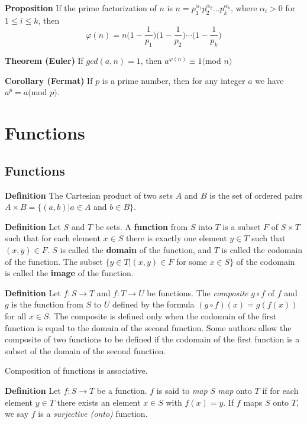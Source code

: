 \documentclass[12pt]{article}
\renewcommand{\mod}{$mod $}
\begin{document}
\textbf{Proposition} If the prime factorization of $n$ is $n = p_{1}^{\alpha_{1}}p_{2}^{\alpha_{2}} \ldots p_{k}^{\alpha_{k}}$, where $\alpha_{i} > 0$ for $1 \leq i \leq k $, then $$\varphi (n) = n \Big( 1 - \frac{1}{p_{1}} \Big) \Big( 1 - \frac{1}{p_{2}} \Big) \cdots \Big( 1 - \frac{1}{p_{k}} \Big) $$

\textbf{Theorem (Euler)} If $gcd(a,n)=1$, then $a^{\varphi (n)} \equiv 1 (\mod n)$

\textbf{Corollary (Fermat)} If $p$ is a prime number, then for any integer $a$ we have $a^{p} = a(\mod p)$.

\section{Functions}

\subsection{Functions}

\textbf{Definition} The Cartesian product of two sets $A$ and $B$ is the set of ordered pairs $A \times B = \{ (a,b) | a \in A$ and $ b \in B \}$.

\textbf{Definition} Let $S$ and $T$ be sets. A \textbf{function} from $S$ into $T$ is a subset $F$ of $S \times T$ such that for each element $x \in S$ there is exactly one element $y \in T$ such that $(x, y) \in F$. $S$ is called the \textbf{domain} of the function, and $T$ is called the codomain of the function. The subset $\{ y \in T | (x, y) \in F $ for some $ x \in S \}$ of the codomain is called the \textbf{image} of the function.

\textbf{Definition} Let $f : S \to T$ and $f : T \to U$ be functions. The \textit{composite} $g \circ f$ of $f$ and $g$ is the function from $S$ to $U$ defined by the formula $(g \circ f)(x) = g(f(x))$ for all $x \in S$. The composite is defined only when the codomain of the first function is equal to the domain of the second function. Some authors allow the composite of two functions to be defined if the codomain of the first function is a subset of the domain of the second function.

Composition of functions is associative.

\textbf{Definition} Let $f : S \to T$ be a function. $f$ is said to \textit{map} $S$ \textit{map} onto $T$ if for each element $y \in T$ there exists an element $x \in S$ with $f(x) = y$. If $f$ maps $S$ onto $T$, we say $f$ is a \textit{surjective (onto)} function.
\end{document}
